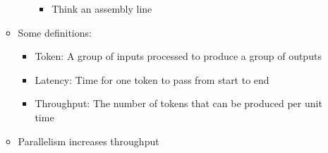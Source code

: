 \documentclass[a4paper]{article}
\begin{document}
\begin{itemize}
\begin{itemize}
\begin{itemize}
\begin{itemize}
\item Think an assembly line
\end{itemize}
\end{itemize}
\item Some definitions:
\begin{itemize}
\item Token: A group of inputs processed to produce a group of outputs
\item Latency: Time for one token to pass from start to end
\item Throughput: The number of tokens that can be produced per unit time
\end{itemize}
\item Parallelism increases throughput
\end{itemize}
\end{itemize}
\end{document}
